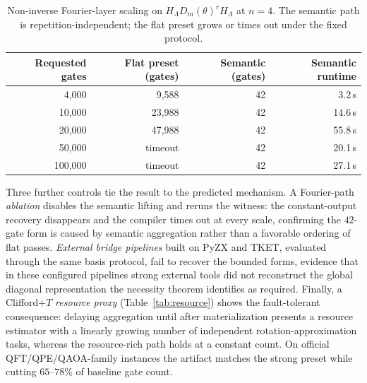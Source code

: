 \documentclass[11pt]{article}
\begin{document}
\begin{table}[ht]
\centering
\small
\begin{tabular}{rrrr}
\toprule
Requested gates & Flat preset (gates) & Semantic (gates) & Semantic runtime \\
\midrule
4{,}000   & 9{,}588   & 42 & 3.2\,s \\
10{,}000  & 23{,}988  & 42 & 14.6\,s \\
20{,}000  & 47{,}988  & 42 & 55.8\,s \\
50{,}000  & timeout   & 42 & 20.1\,s \\
100{,}000 & timeout   & 42 & 27.1\,s \\
\bottomrule
\end{tabular}
\caption{Non-inverse Fourier-layer scaling on $H_\Lambda D_m(\theta)^r H_\Lambda$ at $n=4$. The
semantic path is repetition-independent; the flat preset grows or times out under the fixed
protocol.}
\label{tab:headline}
\end{table}

Three further controls tie the result to the predicted mechanism. A Fourier-path \emph{ablation}
disables the semantic lifting and reruns the witness: the constant-output recovery disappears and
the compiler times out at every scale, confirming the $42$-gate form is caused by semantic
aggregation rather than a favorable ordering of flat passes. \emph{External bridge pipelines} built
on PyZX and TKET, evaluated through the same basis protocol, fail to recover the bounded forms,
evidence that in these configured pipelines strong external tools did not reconstruct the global
diagonal representation the necessity theorem identifies as required. Finally,
a Clifford$+T$ \emph{resource proxy} (Table~\ref{tab:resource}) shows the fault-tolerant
consequence: delaying aggregation until after materialization presents a resource estimator with a
linearly growing number of independent rotation-approximation tasks, whereas the resource-rich path
holds at a constant count. On official QFT/QPE/QAOA-family instances the artifact matches the strong
preset while cutting $65$--$78\%$ of baseline gate count.
\end{document}
